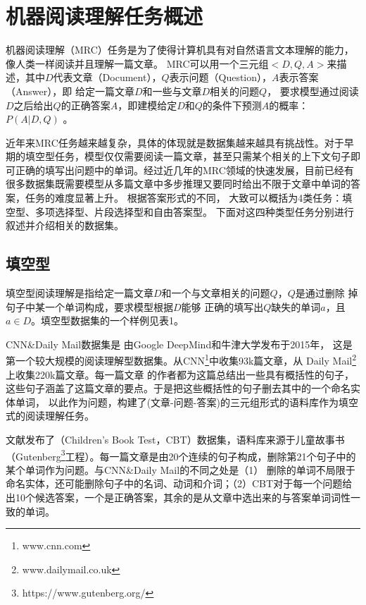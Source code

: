 \section{机器阅读理解任务概述}

机器阅读理解（MRC）任务是为了使得计算机具有对自然语言文本理解的能力，像人类一样阅读并且理解一篇文章。
MRC可以用一个三元组$<D,Q,A>$来描述，其中$D$代表文章（Document），$Q$表示问题（Question），$A$表示答案（Answer），即
给定一篇文章$D$和一些与文章$D$相关的问题$Q$，
要求模型通过阅读$D$之后给出$Q$的正确答案$A$，即建模给定$D$和$Q$的条件下预测$A$的概率：$P(A|D,Q)$
。

近年来MRC任务越来越复杂，具体的体现就是数据集越来越具有挑战性。对于早期的填空型任务，模型仅仅需要阅读一篇文章，甚至只需某个相关的上下文句子即可正确的填写出问题中的单词。经过近几年的MRC领域的快速发展，目前已经有很多数据集既需要模型从多篇文章中多步推理又要同时给出不限于文章中单词的答案，任务的难度显著上升。
根据答案形式的不同，
大致可以概括为4类任务：填空型、多项选择型、片段选择型和自由答案型。
下面对这四种类型任务分别进行叙述并介绍相关的数据集。



\subsection{填空型}
填空型阅读理解是指给定一篇文章$D$和一个与文章相关的问题$Q$，$Q$是通过删除
掉句子中某一个单词构成，要求模型根据$D$能够
正确的填写出$Q$缺失的单词$a$，且$a\in D$。填空型数据集的一个样例见表1。

CNN\&Daily Mail数据集是
由Google DeepMind和牛津大学发布于2015年，
这是第一个较大规模的阅读理解型数据集。从CNN\footnote{www.cnn.com\label{cnn}}中收集93k篇文章，从
Daily Mail\footnote{www.dailymail.co.uk\label{daily mail}}上收集220k篇文章。每一篇文章
的作者都为这篇总结出一些具有概括性的句子，这些句子涵盖了这篇文章的要点。于是把这些概括性的句子删去其中的一个命名实体单词，
以此作为问题，构建了(文章-问题-答案)的三元组形式的语料库作为填空式的阅读理解任务。

文献\cite{CBT}发布了（Children's Book Test，CBT）数据集，语料库来源于儿童故事书（Gutenberg\footnote{https://www.gutenberg.org/\label{cbt}}工程）。每一篇文章是由20个连续的句子构成，删除第21个句子中的某个单词作为问题。与CNN\&Daily Mail的不同之处是（1） 删除的单词不局限于命名实体，还可能删除句子中的名词、动词和介词；（2）CBT对于每一个问题给出10个候选答案，一个是正确答案，其余的是从文章中选出来的与答案单词词性一致的单词。

